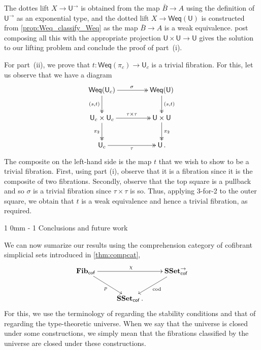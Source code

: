 \documentclass[reqno,10pt,a4paper,oneside]{amsart}
\makeatletter
\renewenvironment{proof}[1][\proofname] {\par\pushQED{\qed}\normalfont\topsep6\p@\@plus6\p@\relax\trivlist\item[\hskip\labelsep\bf#1\@addpunct{.}]\ignorespaces}{\popQED\endtrivlist\@endpefalse}
\renewcommand{\section}{\@startsection
{section}%
{1}%
{0mm}%
{-\baselineskip}%
{1\baselineskip}%
{\Large \bfseries}}%
\numberwithin{equation}{section}
\theoremstyle{mythm}
\theoremstyle{mydef}
\theoremstyle{myrmk}
\newcommand{\co}{\colon}
\newcommand{\SSet}{\mathbf{SSet}}
\newcommand{\U}{\mathsf{U}}
\newcommand{\Weq}{\mathsf{Weq}}
\makeatother
\begin{document}
\begin{proof}
The dottes lift $X \to \U^\to$ is obtained from the map $\bar{B} \to A$ using the definition of $\U^\to$ as an exponential type, and the dotted lift $X \to \Weq(\U)$ is constructed from \cref{prop:Weq_classify_Weq} as the map $\bar{B} \to A$ is a weak equivalence. post composing all this with the appropriate projection $\U \times \U \to \U$ gives the solution to our lifting problem and conclude the proof of part~(i).




For part~(ii), we prove that $t \co \Weq(\pi_c) \to \U_c$ is a trivial fibration. For this, let us
observe that we have a diagram 
\[
\xymatrix@C=1.5cm{
\Weq(\U_c) \ar@{->>}[r]^{\sigma}  \ar@{->>}[d]_{(s,t)} & \Weq(\U) \ar@{->>}[d]^{(s,t)} \\
\U_c \times \U_c \ar@{->>}[r]^{\tau \times \tau} \ar@{->>}[d]_{\pi_2} & \U \times \U \ar@{->>}[d]^{\pi_2} \\
\U_c \ar@{->>}[r]_\tau & \U \, . }
\]
The composite  on the left-hand side is the map $t$ that we wish to show to be a trivial fibration.
First, using part (i), observe that it is a fibration since it is the composite of two fibrations. Secondly,
observe that the top square is a pullback and so $\sigma$ is a trivial fibration since $\tau \times \tau$ 
is so. Thus, applying 3-for-2 to the outer square, we obtain that $t$ is a weak equivalence and hence
a trivial fibration, as required.
\end{proof} 


\section{Conclusions and future work}
\label{sec:conclusion}

We can now sumarize our results using the comprehension category of cofibrant simplicial sets introduced in \cref{thm:compcat}, 
\[ 
\xymatrix{
\mathbf{Fib}_{ \mathsf{cof}} \ar[dr]_{p} \ar[rr]^{\chi} & & \SSet^{\to}_{\mathsf{cof}} \ar[dl]^{\mathrm{cod}} \\ 
 & \SSet_{\mathsf{cof}} \, . &  }
 \]
For this, we use the terminology of \cite{LumsdaineP:locuoc} regarding the stability conditions and
that of  \cite[Appendix~A]{ShulmanM:allths}  regarding the type-theoretic universe. When we say
that the universe is closed under some constructions, we simply mean that the fibrations classified by the universe are closed under these constructions.
\end{document}
